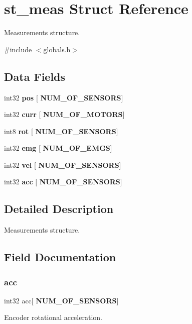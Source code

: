 \section{st\+\_\+meas Struct Reference}
\label{structst__meas}


Measurements structure.  




{\ttfamily \#include $<$globals.\+h$>$}

\subsection*{Data Fields}
\begin{DoxyCompactItemize}
\item 
int32 \textbf{ pos} [\textbf{ N\+U\+M\+\_\+\+O\+F\+\_\+\+S\+E\+N\+S\+O\+RS}]
\item 
int32 \textbf{ curr} [\textbf{ N\+U\+M\+\_\+\+O\+F\+\_\+\+M\+O\+T\+O\+RS}]
\item 
int8 \textbf{ rot} [\textbf{ N\+U\+M\+\_\+\+O\+F\+\_\+\+S\+E\+N\+S\+O\+RS}]
\item 
int32 \textbf{ emg} [\textbf{ N\+U\+M\+\_\+\+O\+F\+\_\+\+E\+M\+GS}]
\item 
int32 \textbf{ vel} [\textbf{ N\+U\+M\+\_\+\+O\+F\+\_\+\+S\+E\+N\+S\+O\+RS}]
\item 
int32 \textbf{ acc} [\textbf{ N\+U\+M\+\_\+\+O\+F\+\_\+\+S\+E\+N\+S\+O\+RS}]
\end{DoxyCompactItemize}


\subsection{Detailed Description}
Measurements structure. 



\subsection{Field Documentation}
\mbox{\label{structst__meas_a382cdae8f034ef5627c27a46e2f00a72}} 
\subsubsection{acc}
{\footnotesize\ttfamily int32 acc[\textbf{ N\+U\+M\+\_\+\+O\+F\+\_\+\+S\+E\+N\+S\+O\+RS}]}

Encoder rotational acceleration. \mbox{\label{structst__meas_a035463484308a2613b907a0cbaa4047c}} 
